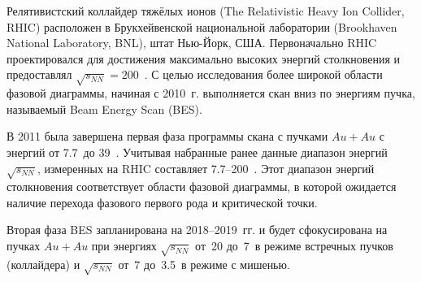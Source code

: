 
Релятивистский коллайдер тяжёлых ионов (The Relativistic Heavy Ion Collider, RHIC) расположен в Брукхейвенской национальной лаборатории (Brookhaven National Laboratory, BNL), штат Нью-Йорк, США. Первоначально RHIC проектировался для достижения максимально высоких энергий столкновения и предоставлял $\sqrt{s_{NN}}=200$~\GeVperNucl. С целью исследования более широкой области фазовой диаграммы, начиная с 2010~г. выполняется скан вниз по энергиям пучка, называемый Beam Energy Scan (BES).



В 2011 была завершена первая фаза программы скана с пучками $Au+Au$ с энергий от 7.7~\GeVperNucl до 39~\GeVperNucl. Учитывая набранные ранее данные диапазон энергий $\sqrt{s_{NN}}$, измеренных на RHIC составляет 7.7--200~\GeVperNucl. Этот диапазон энергий столкновения соответствует области фазовой диаграммы, в которой ожидается наличие перехода фазового первого рода и критической точки.


Вторая фаза BES запланирована на 2018--2019~гг. и будет сфокусирована на пучках $Au+Au$ при энергиях $\sqrt{s_{NN}}$ от~20 до~7~\GeVperNucl в режиме встречных пучков (коллайдера\todo) и $\sqrt{s_{NN}}$ от~7 до~3.5~\GeVperNucl в режиме с мишенью.



